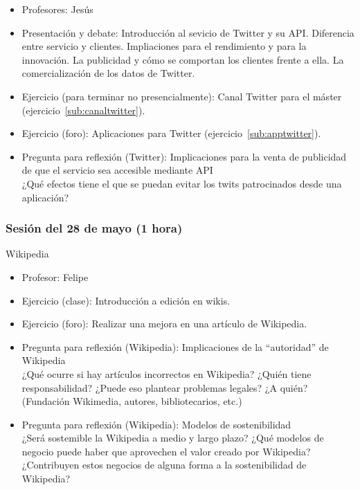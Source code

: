 \documentclass[a4paper,12pt]{article}
\begin{document}
\begin{itemize}
\item Profesores: Jesús
\item Presentación y debate: Introducción al sevicio de Twitter y su API. Diferencia entre servicio y clientes. Impliaciones para el rendimiento y para la innovación. La publicidad y cómo se comportan los clientes frente a ella. La comercialización de los datos de Twitter.
\item Ejercicio (para terminar no presencialmente): Canal Twitter para el máster (ejercicio~\ref{sub:canaltwitter}).
\item Ejercicio (foro): Aplicaciones para Twitter (ejercicio~\ref{sub:apptwitter}).
\item Pregunta para reflexión (Twitter): Implicaciones para la venta de publicidad de que el servicio sea accesible mediante API \\
  ¿Qué efectos tiene el que se puedan evitar los twits patrocinados desde una aplicación?
\end{itemize}

\subsubsection{Sesión del 28 de mayo (1 hora)}


Wikipedia

\begin{itemize}
\item Profesor: Felipe
\item Ejercicio (clase): Introducción a edición en wikis.
\item Ejercicio (foro): Realizar una mejora en una artículo de Wikipedia.
\item Pregunta para reflexión (Wikipedia): Implicaciones de la ``autoridad'' de Wikipedia \\
  ¿Qué ocurre si hay artículos incorrectos en Wikipedia? ¿Quién tiene responsabilidad? ¿Puede eso plantear problemas legales? ¿A quién? (Fundación Wikimedia, autores, bibliotecarios, etc.)
\item Pregunta para reflexión (Wikipedia): Modelos de sostenibilidad \\
  ¿Será sostemible la Wikipedia a medio y largo plazo? ¿Qué modelos de negocio puede haber que aprovechen el valor creado por Wikipedia? ¿Contribuyen estos negocios de alguna forma a la sostenibilidad de Wikipedia?
\end{itemize}
\end{document}
